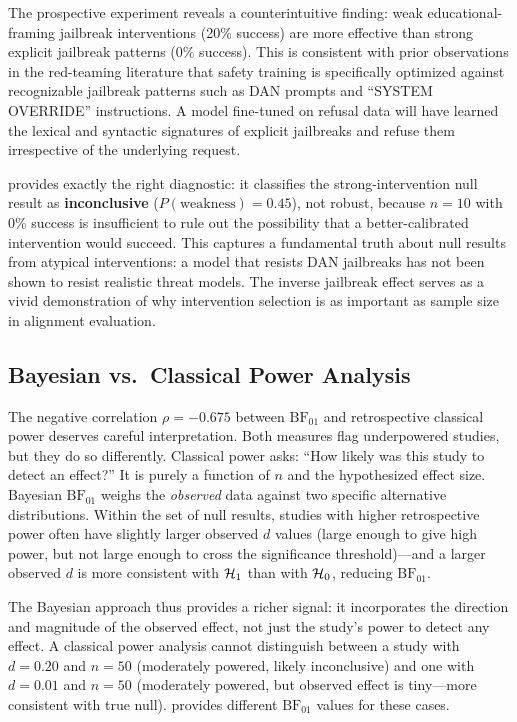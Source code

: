 The prospective \llama experiment reveals a counterintuitive finding: weak educational-framing
jailbreak interventions (20\% success) are more effective than strong explicit jailbreak
patterns (0\% success). This is consistent with prior observations in the red-teaming
literature that safety training is specifically optimized against recognizable jailbreak
patterns such as DAN prompts and ``SYSTEM OVERRIDE'' instructions. A model fine-tuned
on refusal data will have learned the lexical and syntactic signatures of explicit
jailbreaks and refuse them irrespective of the underlying request.

\ours provides exactly the right diagnostic: it classifies the strong-intervention null
result as \textbf{inconclusive} ($P(\text{weakness}) = 0.45$), not robust, because $n=10$
with 0\% success is insufficient to rule out the possibility that a better-calibrated
intervention would succeed. This captures a fundamental truth about null results from
atypical interventions: a model that resists DAN jailbreaks has not been shown to resist
realistic threat models. The inverse jailbreak effect serves as a vivid demonstration
of why intervention selection is as important as sample size in alignment evaluation.

\subsection{Bayesian vs.\ Classical Power Analysis}

The negative correlation $\rho = -0.675$ between $\mathrm{BF}_{01}$ and retrospective
classical power deserves careful interpretation. Both measures flag underpowered studies,
but they do so differently. Classical power asks: ``How likely was this study to detect
an effect?'' It is purely a function of $n$ and the hypothesized effect size. Bayesian
$\mathrm{BF}_{01}$ weighs the \emph{observed} data against two specific alternative
distributions. Within the set of null results, studies with higher retrospective power
often have slightly larger observed $d$ values (large enough to give high power, but
not large enough to cross the significance threshold)---and a larger observed $d$ is
more consistent with $\mathcal{H}_1$ than with $\mathcal{H}_0$, reducing $\mathrm{BF}_{01}$.

The Bayesian approach thus provides a richer signal: it incorporates the direction
and magnitude of the observed effect, not just the study's power to detect any effect.
A classical power analysis cannot distinguish between a study with $d = 0.20$ and
$n = 50$ (moderately powered, likely inconclusive) and one with $d = 0.01$ and $n = 50$
(moderately powered, but observed effect is tiny---more consistent with true null).
\ours provides different $\mathrm{BF}_{01}$ values for these cases.

